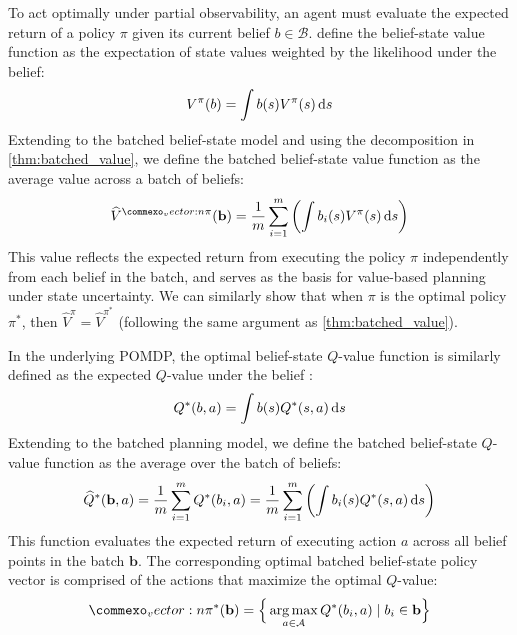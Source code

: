 To act optimally under partial observability, an agent must evaluate the expected return of a policy $\pi$ given its current belief $b \in \mathcal{B}$.
\textcite{kaelbling1998planning} define the belief-state value function as the expectation of state values weighted by the likelihood under the belief:
\begin{equation}\label{eq:belief_value}
    V^\pi(b) = \int b(s) V^\pi(s) \mathop{}\!\mathrm{d} s
\end{equation}
Extending to the batched belief-state model and using the decomposition in \cref{thm:batched_value}, we define the batched belief-state value function as the average value across a batch of beliefs:
\begin{equation}
    \widehat{V}^{\vec{\pi}}(\mathbf{b}) = \frac{1}{m} \sum_{i=1}^m \left( \int b_i(s) V^\pi(s) \diff s\right)
\end{equation}
This value reflects the expected return from executing the policy $\pi$ independently from each belief in the batch, and serves as the basis for value-based planning under state uncertainty.
We can similarly show that when $\pi$ is the optimal policy $\pi^*$, then $\widehat{V}^\pi = \widehat{V}^{\pi^*}$ (following the same argument as \cref{thm:batched_value}).

In the underlying POMDP, the optimal belief-state $Q$-value function is similarly defined as the expected $Q$-value under the belief \cite{kaelbling1998planning}:
\begin{align}
    Q^*(b, a) = \int b(s) Q^*(s,a) \mathop{}\!\mathrm{d} s
\end{align}
Extending to the batched planning model, we define the batched belief-state $Q$-value function as the average over the batch of beliefs:
\begin{equation}
    \widehat{Q}^*(\mathbf{b}, a) = \frac{1}{m} \sum_{i=1}^m Q^*(b_i, a) = \frac{1}{m} \sum_{i=1}^m \left( \int b_i(s) Q^*(s, a) \mathop{}\!\mathrm{d} s\right)
\end{equation}
This function evaluates the expected return of executing action $a$ across all belief points in the batch $\mathbf{b}$.
The corresponding optimal batched belief-state policy vector is comprised of the actions that maximize the optimal $Q$-value:
\begin{equation}
    \vec{\pi}^*(\mathbf{b}) = \Big\{ \argmax_{a \in \mathcal{A}} Q^*(b_i, a) \mid b_i \in \mathbf{b} \Big\}
\end{equation}

